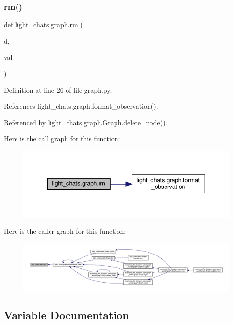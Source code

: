\subsubsection{\texorpdfstring{rm()}{rm()}}
{\footnotesize\ttfamily def light\+\_\+chats.\+graph.\+rm (\begin{DoxyParamCaption}\item[{}]{d,  }\item[{}]{val }\end{DoxyParamCaption})}



Definition at line 26 of file graph.\+py.



References light\+\_\+chats.\+graph.\+format\+\_\+observation().



Referenced by light\+\_\+chats.\+graph.\+Graph.\+delete\+\_\+node().

Here is the call graph for this function\+:
\nopagebreak
\begin{figure}[H]
\begin{center}
\leavevmode
\includegraphics[width=343pt]{namespacelight__chats_1_1graph_a1e4fb75c70e6fbe0b134e3fe135deeba_cgraph}
\end{center}
\end{figure}
Here is the caller graph for this function\+:
\nopagebreak
\begin{figure}[H]
\begin{center}
\leavevmode
\includegraphics[width=350pt]{namespacelight__chats_1_1graph_a1e4fb75c70e6fbe0b134e3fe135deeba_icgraph}
\end{center}
\end{figure}


\subsection{Variable Documentation}
\mbox{\label{namespacelight__chats_1_1graph_a3016377e3a8bd1b935e014e8e8624858}} 

